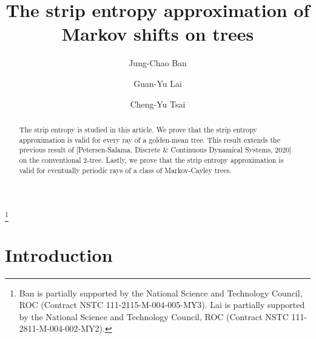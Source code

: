 \documentclass{amsart}
\theoremstyle{definition}
\begin{document}
\title{The strip entropy approximation of Markov shifts on trees}

\author[Jung-Chao Ban]{Jung-Chao Ban}
\address[Jung-Chao Ban]{Department of Mathematical Sciences, National Chengchi University, Taipei 11605, Taiwan, ROC.}
\address{Math. Division, National Center for Theoretical Science, National Taiwan University, Taipei 10617, Taiwan. ROC.}

\author[Guan-Yu Lai]{Guan-Yu Lai}
\address[Guan-Yu Lai]{Department of Mathematical Sciences, National Chengchi University, Taipei 11605, Taiwan, ROC.}

\author[Cheng-Yu Tsai]{Cheng-Yu Tsai}
\address[Cheng-Yu Tsai]{Department of Mathematical Sciences, National Chengchi University, Taipei 11605, Taiwan, ROC.}

\thanks{Ban is partially supported by the National Science and Technology Council, ROC (Contract NSTC 111-2115-M-004-005-MY3). Lai is partially supported by the National Science and Technology Council, ROC (Contract NSTC 111-2811-M-004-002-MY2).}
\date{}

\baselineskip
\maketitle
\begin{abstract}
The strip entropy is studied in this article. We prove that the strip entropy approximation is valid for every ray of a golden-mean tree. This result extends the previous result of [Petersen-Salama, Discrete \& Continuous Dynamical Systems, 2020] on the conventional 2-tree. Lastly, we prove that the strip entropy approximation is valid for eventually periodic rays of a class of Markov-Cayley trees.
\end{abstract}



\section{Introduction}
\end{document}
